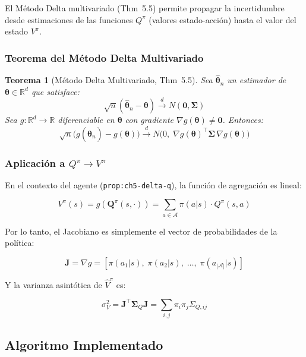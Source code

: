\documentclass[12pt,a4paper]{article}
\newtheorem{theorem}{Teorema}[section]
\begin{document}
El Método Delta multivariado (Thm~5.5) permite propagar la incertidumbre desde estimaciones de las funciones $Q^{\pi}$ (valores estado-acción) hasta el valor del estado $V^{\pi}$.

\subsubsection{Teorema del Método Delta Multivariado}

\begin{theorem}[Método Delta Multivariado, Thm~5.5]
	Sea $\hat{\boldsymbol{\theta}}_n$ un estimador de $\boldsymbol{\theta} \in \mathbb{R}^d$ que satisface:
	\[
		\sqrt{n}(\hat{\boldsymbol{\theta}}_n - \boldsymbol{\theta}) \xrightarrow{d} N(\mathbf{0}, \boldsymbol{\Sigma})
	\]
	Sea $g: \mathbb{R}^d \to \mathbb{R}$ diferenciable en $\boldsymbol{\theta}$ con gradiente $\nabla g(\boldsymbol{\theta}) \neq \mathbf{0}$. Entonces:
	\[
		\sqrt{n}\big(g(\hat{\boldsymbol{\theta}}_n) - g(\boldsymbol{\theta})\big) \xrightarrow{d} N\big(0,\; \nabla g(\boldsymbol{\theta})^\top \boldsymbol{\Sigma}\, \nabla g(\boldsymbol{\theta})\big)
	\]
\end{theorem}

\subsubsection{Aplicación a $Q^{\pi} \to V^{\pi}$}

En el contexto del agente (\texttt{prop:ch5-delta-q}), la función de agregación es lineal:

\[
	V^{\pi}(s) = g(\mathbf{Q}^{\pi}(s, \cdot)) = \sum_{a \in \mathcal{A}} \pi(a|s) \cdot Q^{\pi}(s, a)
\]

Por lo tanto, el Jacobiano es simplemente el vector de probabilidades de la política:

\[
	\mathbf{J} = \nabla g = [\pi(a_1|s),\; \pi(a_2|s),\; \dots,\; \pi(a_{|\mathcal{A}|}|s)]
\]

Y la varianza asintótica de $\hat{V}^{\pi}$ es:

\[
	\sigma^2_V = \mathbf{J}^\top \boldsymbol{\Sigma}_Q \mathbf{J} = \sum_{i,j} \pi_i \pi_j \Sigma_{Q,ij}
\]

\subsection{Algoritmo Implementado}
\end{document}
